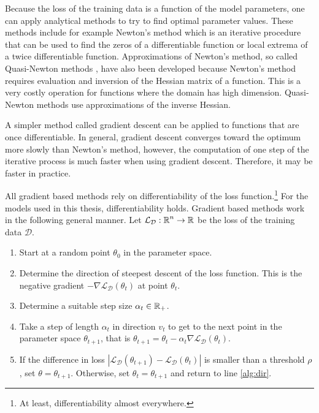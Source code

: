 Because the loss of the training data is a function of the model
parameters, one can apply analytical methods to try to find optimal
parameter values. These methods include for example Newton's method
which is an iterative procedure that can be used to find the zeros of
a differentiable function or local extrema of a twice differentiable
function. Approximations of Newton's method, so called Quasi-Newton
methods \citep{Liu1989}, have also been developed because Newton's
method requires evaluation and inversion of the Hessian matrix of a
function. This is a very costly operation for functions where the
domain has high dimension. Quasi-Newton methods use approximations of
the inverse Hessian.

A simpler method called gradient descent can be applied to functions
that are once differentiable. In
general, gradient descent converges toward the optimum more slowly
than Newton's method, however, the computation of one step of the
iterative process is much faster when using gradient
descent. Therefore, it may be faster in practice.

All gradient based methods rely on differentiability of the loss
function.\footnote{At least, differentiability almost everywhere.} For
the models used in this thesis, differentiability holds. Gradient
based methods work in the following general manner. Let
$\mathcal{L}_{\mathcal{D}}:\mbox{$\mathbb R$}^n \rightarrow \mbox{$\mathbb R$}$ be the loss of the training data
$\mathcal{D}$.

\begin{enumerate}
\item Start at a random point $\theta_0$ in the parameter space.
\item Determine the direction of steepest descent of the loss
function. This is the negative gradient $-\nabla
\mathcal{L}_{\mathcal{D}}(\theta_t)$ at point $\theta_t$.\label{alg:dir}
\item Determine a suitable step size $\alpha_t \in \mbox{$\mathbb R$}_+$.
\item Take a step of length $\alpha_t$ in direction $v_t$ to get to
the next point in the parameter space $\theta_{t+1}$, that is
$\theta_{t+1} = \theta_t - \alpha_t \nabla \mathcal{L}_{\mathcal{D}}(\theta_t)$.
\item If the difference in loss $|\mathcal{L}_{\mathcal{D}}(\theta_{t+1}) -
\mathcal{L}_{\mathcal{D}}(\theta_t)|$ is smaller than a threshold $\rho$, set
$\theta = \theta_{t+1}$. Otherwise, set $\theta_t = \theta_{t+1}$ and
return to line \ref{alg:dir}.
\end{enumerate}

